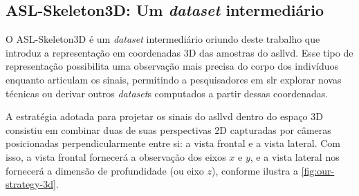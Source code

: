 \subsection{ASL-Skeleton3D: Um \textit{dataset} intermediário}
\label{sec:metodologia-datasets-3d}

O ASL-Skeleton3D é um \textit{dataset} intermediário oriundo deste trabalho que introduz a representação em coordenadas 3D das amostras do \acrshort{asllvd}. Esse tipo de representação possibilita uma observação mais precisa do corpo dos indivíduos enquanto articulam os sinais, permitindo a pesquisadores em \acrshort{slr} explorar novas técnicas ou derivar outros \textit{dataset}s computados a partir dessas coordenadas.

A estratégia adotada para projetar os sinais do \acrshort{asllvd} dentro do espaço 3D consistiu em combinar duas de suas perspectivas 2D capturadas por câmeras posicionadas perpendicularmente entre si: a vista frontal e a vista lateral. Com isso, a vista frontal fornecerá a observação dos eixos \(x\) e \(y\), e a vista lateral nos fornecerá a dimensão de profundidade (ou eixo \( z\)), conforme ilustra a \autoref{fig:our-strategy-3d}.


